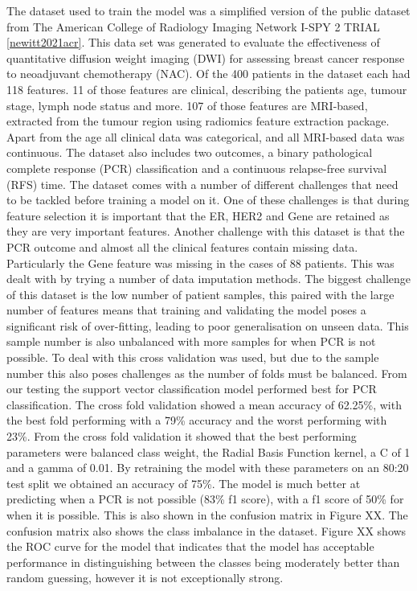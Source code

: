 \documentclass{article}
\begin{document}
The dataset used to train the model was a simplified version of the public dataset from The American College of Radiology Imaging Network I-SPY 2 TRIAL \ref{newitt2021acr}. This data set was generated to evaluate the effectiveness of quantitative diffusion weight imaging (DWI) for assessing breast cancer response to neoadjuvant chemotherapy (NAC). Of the 400 patients in the dataset each had 118 features. 11 of those features are clinical, describing the patients age, tumour stage, lymph node status and more. 107 of those features are MRI-based, extracted from the tumour region using radiomics feature extraction package. Apart from the age all clinical data was categorical, and all MRI-based data was continuous. The dataset also includes two outcomes, a binary pathological complete response (PCR) classification and a continuous relapse-free survival (RFS) time.
The dataset comes with a number of different challenges that need to be tackled before training a model on it. One of these challenges is that during feature selection it is important that the ER, HER2 and Gene are retained as they are very important features. Another challenge with this dataset is that the PCR outcome and almost all the clinical features contain missing data. Particularly the Gene feature was missing in the cases of 88 patients. This was dealt with by trying a number of data imputation methods. The biggest challenge of this dataset is the low number of patient samples, this paired with the large number of features means that training and validating the model poses a significant risk of over-fitting, leading to poor generalisation on unseen data. This sample number is also unbalanced with more samples for when PCR is not possible. To deal with this cross validation was used, but due to the sample number this also poses challenges as the number of folds must be balanced.
From our testing the support vector classification model performed best for PCR classification. The cross fold validation showed a mean accuracy of 62.25\%, with the best fold performing with a 79\% accuracy and the worst performing with 23\%. From the cross fold validation it showed that the best performing parameters were balanced class weight, the Radial Basis Function kernel, a C of 1 and a gamma of 0.01. By retraining the model with these parameters on an 80:20 test split we obtained an accuracy of 75\%. The model is much better at predicting when a PCR is not possible (83\% f1 score), with a f1 score of 50\% for when it is possible. This is also shown in the confusion matrix in Figure XX. The confusion matrix also shows the class imbalance in the dataset. Figure XX shows the ROC curve for the model that indicates that the model has acceptable performance in distinguishing between the classes being moderately better than random guessing, however it is not exceptionally strong.
\end{document}
